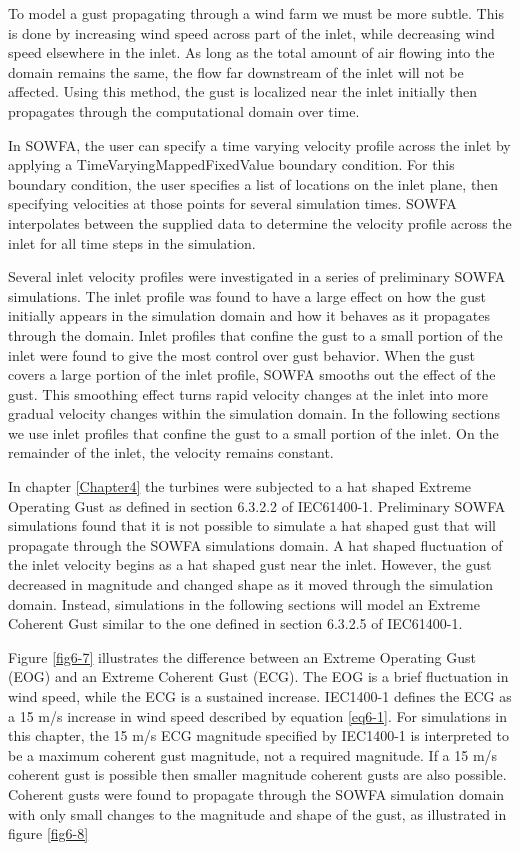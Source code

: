 To model a gust propagating through a wind farm we must be more subtle. This is done by increasing wind speed across part of the inlet, while decreasing wind speed elsewhere in the inlet. As long as the total amount of air flowing into the domain remains the same, the flow far downstream of the inlet will not be affected. Using this method, the gust is localized near the inlet initially then propagates through the computational domain over time. 

In SOWFA, the user can specify a time varying velocity profile across the inlet by applying a TimeVaryingMappedFixedValue boundary condition. For this boundary condition, the user specifies a list of locations on the inlet plane, then specifying velocities at those points for several simulation times. SOWFA interpolates between the supplied data to determine the velocity profile across the inlet for all time steps in the simulation.

Several inlet velocity profiles were investigated in a series of preliminary SOWFA simulations. The inlet profile was found to have a large effect on how the gust initially appears in the simulation domain and how it behaves as it propagates through the domain. Inlet profiles that confine the gust to a small portion of the inlet were found to give the most control over gust behavior. When the gust covers a large portion of the inlet profile, SOWFA smooths out the effect of the gust. This smoothing effect turns rapid velocity changes at the inlet into more gradual velocity changes within the simulation domain. In the following sections we use inlet profiles that confine the gust to a small portion of the inlet. On the remainder of the inlet, the velocity remains constant. 

In chapter \ref{Chapter4} the turbines were subjected to a hat shaped Extreme Operating Gust as defined in section 6.3.2.2 of IEC61400-1\cite{IEC2005}. Preliminary SOWFA simulations found that it is not possible to simulate a hat shaped gust that will propagate through the SOWFA simulations domain. A hat shaped fluctuation of the inlet velocity begins as a hat shaped gust near the inlet. However, the gust decreased in magnitude and changed shape as it moved through the simulation domain. Instead, simulations in the following sections will model an Extreme Coherent Gust similar to the one defined in section 6.3.2.5 of IEC61400-1. 

Figure \ref{fig6-7} illustrates the difference between an Extreme Operating Gust (EOG) and an Extreme Coherent Gust (ECG). The EOG is a brief fluctuation in wind speed, while the ECG is a sustained increase. IEC1400-1 defines the ECG as a 15 m/s increase in wind speed described by equation \ref{eq6-1}. For simulations in this chapter, the 15 m/s ECG magnitude specified by IEC1400-1 is interpreted to be a maximum coherent gust magnitude, not a required magnitude. If a 15 m/s coherent gust is possible then smaller magnitude coherent gusts are also possible. Coherent gusts were found to propagate through the SOWFA simulation domain with only small changes to the magnitude and shape of the gust, as illustrated in figure \ref{fig6-8}

